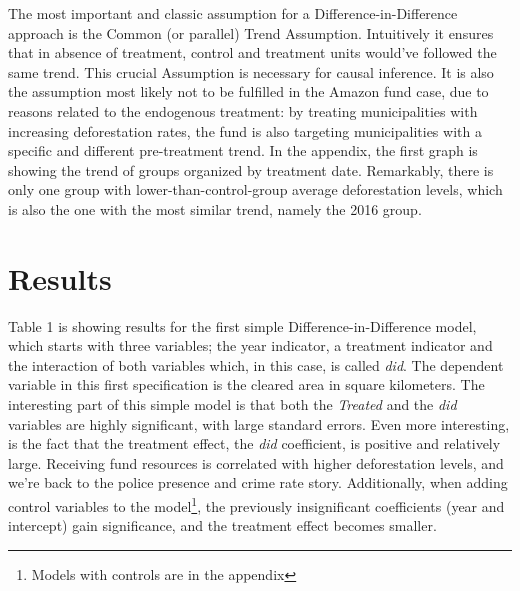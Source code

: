 \documentclass[11pt, oneside]{article}   	%
\begin{document}
The most important and classic assumption for a Difference-in-Difference approach is the Common (or parallel) Trend Assumption. Intuitively it ensures that in absence of treatment, control and treatment units would've followed the same trend. This crucial Assumption is necessary for causal inference. It is also the assumption most likely not to be fulfilled in the Amazon fund case, due to reasons related to the endogenous treatment: by treating municipalities with increasing deforestation rates, the fund is also targeting municipalities with a specific and different pre-treatment trend. In the appendix, the first graph is showing the trend of groups organized by treatment date. Remarkably, there is only one group with lower-than-control-group average deforestation levels, which is also the one with the most similar trend, namely the 2016 group. 


\section{Results}

Table 1 is showing results for the first simple Difference-in-Difference model, which starts with three variables; the year indicator, a treatment indicator and the interaction of both variables which, in this case, is called \textit{did}. The dependent variable in this first specification is the cleared area in square kilometers. The interesting part of this simple model is that both the \textit{Treated} and the \textit{did} variables are highly significant, with large standard errors. Even more interesting, is the fact that the treatment effect, the \textit{did} coefficient, is positive and relatively large. Receiving fund resources is correlated with higher deforestation levels, and we're back to the police presence and crime rate story. Additionally, when adding control variables to the model\footnote{Models with controls are in the appendix}, the previously insignificant coefficients (year and intercept) gain significance, and the treatment effect becomes smaller. 
\end{document}
